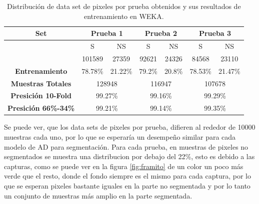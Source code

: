 \documentclass[twoside,spanish,ESP,MSc]{plantillaLabUPV}
\theoremstyle{definition}
\begin{document}
\begin{table}[h]
	\caption{Distribución de data set de pixeles por prueba obtenidos y sus resultados de entrenamiento en WEKA.}
	\label{pixet}
	\centering
	\begin{tabular}{|c|c|c|c|c|c|c|}
		\hline
		\textbf{Set}                             & \multicolumn{2}{c|}{\textbf{Prueba 1}}               & \multicolumn{2}{c|}{\textbf{Prueba 2}}               & \multicolumn{2}{c|}{\textbf{Prueba 3}}               \\ \hline
		& {\color[HTML]{000000} S} & {\color[HTML]{000000} NS} & {\color[HTML]{000000} S} & {\color[HTML]{000000} NS} & {\color[HTML]{000000} S} & {\color[HTML]{000000} NS} \\ \cline{2-7} 
		& 101589                   & 27359                     & 92621                        & 24326                         & 84568                        & 23110                         \\ \cline{2-7} 
		\multirow{-3}{*}{\textbf{Entrenamiento}} & 78.78\%                  & 21.22\%                   & 79.2\%                      & 20.8\%                       & 78.53\%                      & 21.47\%                       \\ \hline
		\textbf{Muestras Totales}                & \multicolumn{2}{c|}{{\color[HTML]{000000} 128948}}   & \multicolumn{2}{c|}{{\color[HTML]{000000} 116947}}      & \multicolumn{2}{c|}{{\color[HTML]{000000} 107678}}      \\ \hline
		\textbf{Presición 10-Fold}               & \multicolumn{2}{c|}{99.27\%}                         & \multicolumn{2}{c|}{99.16\%}                             & \multicolumn{2}{c|}{99.29\%}                             \\ \hline
		\textbf{Presición 66\%-34\%}             & \multicolumn{2}{c|}{99.21\%}                         & \multicolumn{2}{c|}{99.14\%}                             & \multicolumn{2}{c|}{99.35\%}                             \\ \hline
	\end{tabular}
\end{table}

Se puede ver, que los data sets de pixeles por prueba, difieren al rededor de 10000 muestras cada uno, por lo que se esperaría un desempeño similar para cada modelo de AD para segmentación. Para cada prueba, en muestras de pixeles no segmentados se muestra una distribucion por debajo del 22\%, esto es debido a las capturas, como se puede ver en la figura \ref{fig:framito} de un color un poco más verde que el resto, donde el fondo siempre es el mismo para cada captura, por lo que se esperan pixeles bastante iguales en la parte no segmentada y por lo tanto un conjunto de muestras más amplio en la parte segmentada. 
\end{document}
